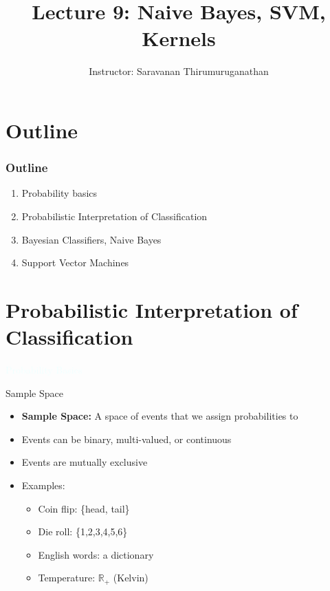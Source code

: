 \documentclass{beamer}
\title[Saravanan Thirumuruganathan] 
{Lecture 9: Naive Bayes, SVM, Kernels}
\author[CSE 5334, Data Mining] 
{Instructor: Saravanan Thirumuruganathan}
\date[]
\newcommand{\thblue}[1]{{\Huge {\textcolor{azure}{#1}}}}
\begin{document}
\begin{frame}
  \titlepage
\end{frame}


\section{Outline}

\begin{frame}
\frametitle {Outline}
    \begin{enumerate}
        \item Probability basics
        \item Probabilistic Interpretation of Classification
        \item Bayesian Classifiers, Naive Bayes
        \item Support Vector Machines
    \end{enumerate}
\end{frame}




\section{Probabilistic Interpretation of Classification}
\begin{frame}{} 
    \begin{center}
        \thblue{Probability Basics}
    \end{center}
\end{frame}


\begin{frame}{Sample Space}
    \begin{itemize}
        \item {\bf Sample Space:} A space of events that we assign probabilities to
        \item Events can be binary, multi-valued, or continuous
        \item Events are mutually exclusive
        \item Examples:
        \begin{itemize}
            \item Coin flip: \{head, tail\}
            \item Die roll: \{1,2,3,4,5,6\}
            \item English words: a dictionary
            \item Temperature: $\mathbb{R}_{+}$ (Kelvin)
        \end{itemize}
    \end{itemize}
\end{frame}
\end{document}
